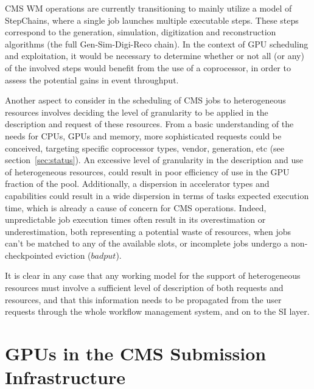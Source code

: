 \documentclass{webofc}
\begin{document}
CMS WM operations are currently transitioning to mainly utilize a model of StepChains, where a single job launches multiple executable steps. These steps correspond to the generation, simulation, digitization and reconstruction algorithms (the full Gen-Sim-Digi-Reco chain). In the context of GPU scheduling and exploitation, it would be necessary to determine whether or not all (or any) of the involved steps would benefit from the use of a coprocessor, in order to assess the potential gains in event throughput.

Another aspect to consider in the scheduling of CMS jobs to heterogeneous resources involves deciding the level of granularity to be applied in the description and request of these resources. From a basic understanding of the needs for CPUs, GPUs and memory, more sophisticated requests could be conceived, targeting specific coprocessor types, vendor, generation, etc (see section~\ref{sec:status}). An excessive level of granularity in the description and use of heterogeneous resources, could result in poor efficiency of use in the GPU fraction of the pool. Additionally, a dispersion in accelerator types and capabilities could result in a wide dispersion in terms of tasks expected execution time, which is already a cause of concern for CMS operations. Indeed, unpredictable job execution times often result in its overestimation or underestimation, both representing a potential waste of resources, when jobs can't be matched to any of the available slots, or incomplete jobs undergo a non-checkpointed eviction ($badput$). 

It is clear in any case that any working model for the support of heterogeneous resources must involve a sufficient level of description of both requests and resources, and that this information needs to be propagated from the user requests through the whole workflow management system, and on to the SI layer.

\section{GPUs in the CMS Submission Infrastructure}
\label{sec:globalpool}
\end{document}
